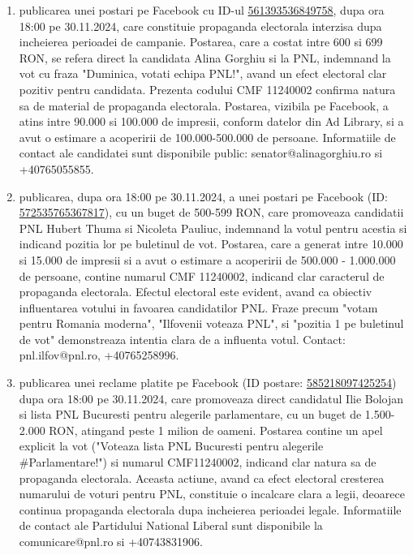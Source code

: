 \documentclass[a4paper,12pt]{article}
\begin{document}
\begin{enumerate}[leftmargin=*, label=\arabic*.)]
    \item publicarea unei postari pe Facebook cu ID-ul \href{https://www.facebook.com/ads/library/?id=561393536849758}{561393536849758}, dupa ora 18:00 pe 30.11.2024, care constituie propaganda electorala interzisa dupa incheierea perioadei de campanie. Postarea, care a costat intre 600 si 699 RON,  se refera direct la candidata Alina Gorghiu si la PNL, indemnand la vot cu fraza "Duminica, votati echipa PNL!", avand un efect electoral clar pozitiv pentru candidata. Prezenta codului CMF 11240002 confirma natura sa de material de propaganda electorala.  Postarea, vizibila pe Facebook, a atins intre 90.000 si 100.000 de impresii, conform datelor din Ad Library,  si a avut o estimare a acoperirii de 100.000-500.000 de persoane.  Informatiile de contact ale candidatei sunt disponibile public: senator@alinagorghiu.ro si +40765055855.
    \item publicarea, dupa ora 18:00 pe 30.11.2024, a unei postari pe Facebook (ID: \href{https://www.facebook.com/ads/library/?id=572535765367817}{572535765367817}), cu un buget de 500-599 RON, care promoveaza candidatii PNL Hubert Thuma si Nicoleta Pauliuc, indemnand la votul pentru acestia si indicand pozitia lor pe buletinul de vot. Postarea, care a generat intre 10.000 si 15.000 de impresii si a avut o estimare a acoperirii de 500.000 - 1.000.000 de persoane, contine numarul CMF 11240002, indicand clar caracterul de propaganda electorala.  Efectul electoral este evident, avand ca obiectiv influentarea votului in favoarea candidatilor PNL.  Fraze precum "votam pentru Romania moderna", "Ilfovenii voteaza PNL", si "pozitia 1 pe buletinul de vot" demonstreaza intentia clara de a influenta votul.  Contact: pnl.ilfov@pnl.ro, +40765258996.
    \item publicarea unei reclame platite pe Facebook (ID postare: \href{https://www.facebook.com/ads/library/?id=585218097425254}{585218097425254}) dupa ora 18:00 pe 30.11.2024, care promoveaza direct candidatul Ilie Bolojan si lista PNL Bucuresti pentru alegerile parlamentare, cu un buget de 1.500-2.000 RON, atingand peste 1 milion de oameni.  Postarea contine un apel explicit la vot ("Voteaza lista PNL Bucuresti pentru alegerile \#Parlamentare!") si numarul CMF11240002, indicand clar natura sa de propaganda electorala.  Aceasta actiune, avand ca efect electoral cresterea numarului de voturi pentru PNL, constituie o incalcare clara a legii, deoarece continua propaganda electorala dupa incheierea perioadei legale.  Informatiile de contact ale Partidului National Liberal sunt disponibile la comunicare@pnl.ro si +40743831906.

\end{enumerate}
\end{document}
